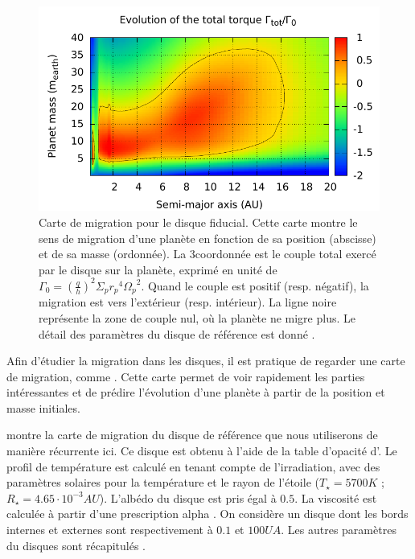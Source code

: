 \begin{figure}[htb]
\centering
\includegraphics[width=\linewidth]{figure/migration_map/fiducial.pdf}

\caption{Carte de migration pour le disque fiducial. Cette carte montre le sens de migration d'une planète en fonction de sa position (abscisse) et de sa masse (ordonnée). La 3\ieme coordonnée est le couple total exercé par le disque sur la planète, exprimé en unité de $\Gamma_0 = \left(\frac{q}{h}\right)^2\Sigma_p {r_p}^4 {\Omega_p}^2$. Quand le couple est positif (resp. négatif), la migration est vers l'extérieur (resp. intérieur). La ligne noire représente la zone de couple nul, où la planète ne migre plus. Le détail des paramètres du disque de référence est donné . }\label{fig:fiducial_migration_map}
\end{figure}

Afin d'étudier la migration dans les disques, il est pratique de regarder une \og carte de migration\fg, comme . Cette carte permet de voir rapidement les parties intéressantes et de prédire l'évolution d'une planète à partir de la position et masse initiales.

 montre la carte de migration du disque de référence que nous utiliserons de manière récurrente ici. Ce disque est obtenu à l'aide de la table d'opacité d'\cite{hure2000transition}. Le profil de température est calculé en tenant compte de l'irradiation, avec des paramètres solaires pour la température et le rayon de l'étoile ($T_\star = 5700\unit{K}$ ; $R_\star = 4.65\cdot 10^{-3}\unit{AU}$). L'albédo du disque est pris égal à $0.5$. La viscosité est calculée à partir d'une prescription alpha \citep{shakura1973black}. On considère un disque dont les bords internes et externes sont respectivement à $0.1$ et $100\unit{UA}$. Les autres paramètres du disques sont récapitulés . 

